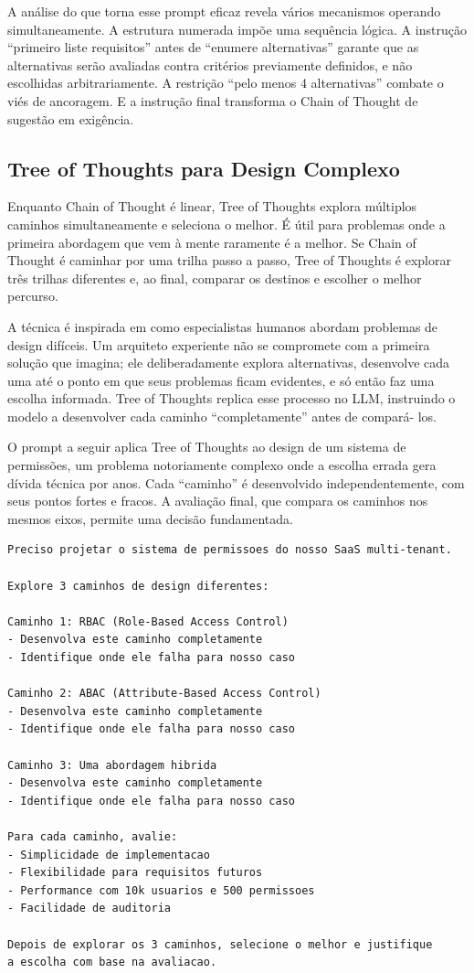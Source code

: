 A análise do que torna esse prompt eficaz revela vários mecanismos operando
simultaneamente. A estrutura numerada impõe uma sequência lógica. A instrução
``primeiro liste requisitos'' antes de ``enumere alternativas'' garante que as
alternativas serão avaliadas contra critérios previamente definidos, e não
escolhidas arbitrariamente. A restrição ``pelo menos 4 alternativas'' combate o
viés de ancoragem. E a instrução final transforma o Chain of Thought de
sugestão em exigência.

\subsection{Tree of Thoughts para Design Complexo}

Enquanto Chain of Thought é linear, Tree of Thoughts explora múltiplos caminhos
simultaneamente e seleciona o melhor. É útil para problemas onde a primeira
abordagem que vem à mente raramente é a melhor. Se Chain of Thought é caminhar
por uma trilha passo a passo, Tree of Thoughts é explorar três trilhas diferentes
e, ao final, comparar os destinos e escolher o melhor percurso.

A técnica é inspirada em como especialistas humanos abordam problemas de design
difíceis. Um arquiteto experiente não se compromete com a
primeira solução que imagina; ele deliberadamente explora alternativas,
desenvolve cada uma até o ponto em que seus problemas ficam evidentes, e só então
faz uma escolha informada. Tree of Thoughts replica esse processo no LLM,
instruindo o modelo a desenvolver cada caminho ``completamente'' antes de compará-
los.

O prompt a seguir aplica Tree of Thoughts ao design de um sistema de permissões,
um problema notoriamente complexo onde a escolha errada gera dívida técnica por
anos. Cada ``caminho'' é desenvolvido independentemente, com seus pontos fortes
e fracos. A avaliação final, que compara os caminhos nos mesmos eixos, permite
uma decisão fundamentada.

\begin{lstlisting}[language={}, caption={Prompt usando Tree of Thoughts}]
Preciso projetar o sistema de permissoes do nosso SaaS multi-tenant.

Explore 3 caminhos de design diferentes:

Caminho 1: RBAC (Role-Based Access Control)
- Desenvolva este caminho completamente
- Identifique onde ele falha para nosso caso

Caminho 2: ABAC (Attribute-Based Access Control)
- Desenvolva este caminho completamente
- Identifique onde ele falha para nosso caso

Caminho 3: Uma abordagem hibrida
- Desenvolva este caminho completamente
- Identifique onde ele falha para nosso caso

Para cada caminho, avalie:
- Simplicidade de implementacao
- Flexibilidade para requisitos futuros
- Performance com 10k usuarios e 500 permissoes
- Facilidade de auditoria

Depois de explorar os 3 caminhos, selecione o melhor e justifique
a escolha com base na avaliacao.
\end{lstlisting}

